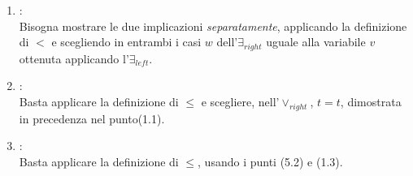 \begin{enumerate}
	{\scriptsize{$$\prooftree
	\vdash_{1.6}t=0+t\qquad \[v+w+t=t,t=0+t\vdash_{1.3}v+w+t=0+t\qquad v+w+t=0+t\vdash_{2.4}v+w=0\justifies v+w+t=t,t=0+t\vdash v+w=0\using{cut}\]\justifies v+w+t=t\vdash v+w=0\using{cut}
	\endprooftree$$	}}
\vspace{.5cm}
	(5B)
{\scriptsize{$$\prooftree
	v+w+t=t\vdash_{5A} v+w=0\qquad\[v+w=0\vdash_{3.4}v=0\mbox{\&} w=0\qquad\[\[v=0\vdash_{ax} v=0\justifies v=0,v\neq 0\vdash\bot\using{\neg_{left}}\]\justifies v=0\mbox{\&} w=0,v\neq 0\vdash\bot\using{\mbox{\&}_{left}}\]\justifies v+w=0,v\neq 0\vdash\bot\using{cut}\]\justifies v+w+t=t,v\neq 0\vdash\bot\using{cut}
	\endprooftree$$}}	\vspace{.2cm}
	e (5C)
	{\tiny{$$\prooftree
	p=w+t\vdash_{1.9}v+p=v+w+t\qquad\[v+p=v+w+t,v+p=t\vdash_{U1}v+w+t=t\qquad v+w+t=t,v\neq 0\vdash_{5B}\bot\justifies v\neq 0,v+p=v+w+t,v+p=t\vdash\bot\using{cut}\]\justifies p=w+t,v\neq 0,v+p=t\vdash\bot\using{cut}
	\endprooftree$$	}}
	\vspace{.2cm}
{\scriptsize{$$\prooftree
	\[\[w+t=p\vdash_{1.2}p=w+t\quad w\neq 0,p=w+t,v\neq 0,v+p=t\vdash_{5C}\bot\justifies w\neq 0,w+t=p,v\neq 0\mbox{\&} v+p=t\vdash\bot\using{cut+\mbox{\&}_{left}}\]\justifies\exists w(w\neq 0\mbox{\&}\ w+t=p),\exists v(v\neq 0\mbox{\&} v+p=t)\vdash\bot\using{\exists_{left}+\mbox{\&}_{left}}\]\justifies \exists w(w\neq 0\mbox{\&} w+t=p)\vdash\neg\exists v(v\neq 0\mbox{\&} v+p=t)\using{\neg_{right}}
	\endprooftree$$}}
	\vspace{.5cm}
	\item[(5.4)] [ $\vdash t<p\ \leftrightarrow\ t+r<p+r$ ]:
	\vspace{.2cm}
	\\Bisogna mostrare le due implicazioni \textsl{separatamente}, applicando la definizione di $<$ e scegliendo in entrambi i casi $w$ dell'$\exists_{right}$ uguale alla variabile $v$ ottenuta applicando l'$\exists_{left}$.
	\vspace{.5cm}
	\item[(5.5)] [ $\vdash t\leq t$ ]:
	\vspace{.2cm}
	\\Basta applicare la definizione di $\leq$ e scegliere, nell'$\vee_{right}$, $t=t$, dimostrata in precedenza nel punto(1.1).
	\vspace{.5cm}
	\item[(5.6)] [ $t\leq p,p\leq r\vdash t\leq r$ ]:
	\vspace{.2cm}
	\\Basta applicare la definizione di $\leq$, usando i punti (5.2) e (1.3).

\end{enumerate}
